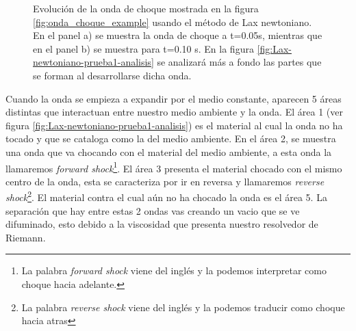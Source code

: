 \documentclass[12pt,a4paper]{book}
\begin{document}
\begin{figure}
\caption{\label{fig:Lax-newtoniano_sedov-3-5}Evolución de la onda de choque mostrada en la figura \ref{fig:onda_choque_example} usando el método de Lax newtoniano. En el panel a) se muestra la onda de choque a t=0.05s, mientras que en el panel b) se muestra para t=0.10 s. En la figura \ref{fig:Lax-newtoniano-prueba1-analisis} se analizará más a fondo las partes que se forman al desarrollarse dicha onda.}
\end{figure}


Cuando la onda se empieza a expandir por el medio constante, aparecen 5 áreas distintas que interactuan entre nuestro medio ambiente y la onda. El área 1 (ver figura \ref{fig:Lax-newtoniano-prueba1-analisis}) es el material al cual la onda no ha tocado y que se cataloga como la del medio ambiente. En el área 2, se muestra una onda que va chocando con el material del medio ambiente, a esta onda la llamaremos \emph{forward shock}\footnote{La palabra \emph{forward shock} viene del inglés y la podemos interpretar como choque hacia adelante. }. El área 3 presenta el material chocado con el mismo centro de la onda, esta se caracteriza por ir en reversa y llamaremos \emph{reverse shock}\footnote{La palabra \emph{reverse shock} viene del inglés y la podemos traducir como choque hacia atras}. El material contra el cual aún no ha chocado la onda es el área 5. La separación que hay entre estas 2 ondas vas creando un vacio que se ve difuminado, esto debido a la viscosidad que presenta nuestro resolvedor de Riemann.
\end{document}
